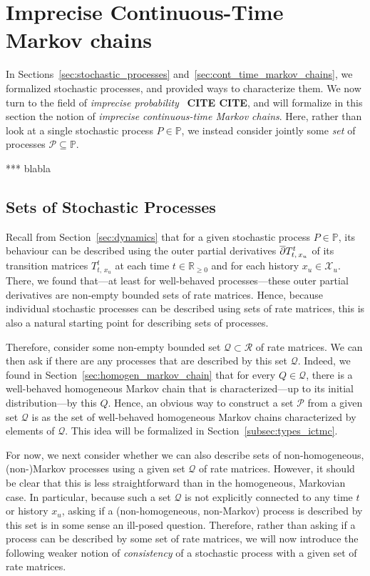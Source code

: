 \documentclass[10pt,a4paper]{paper}
\theoremstyle{definition}
\newcommand{\reals}{\mathbb{R}}
\newcommand{\realsnonneg}{\reals_{\geq 0}}
\newcommand{\states}{\mathcal{X}}
\newcommand{\processes}{\mathbb{P}}
\newcommand{\rateset}{\mathcal{Q}}
\begin{document}
\section{Imprecise Continuous-Time Markov chains}
\label{sec:iCTMC}

In Sections~\ref{sec:stochastic_processes} and~\ref{sec:cont_time_markov_chains}, we formalized stochastic processes, and provided ways to characterize them. We now turn to the field of \emph{imprecise probability}~\cite{Walley:1991vk} {\bf CITE CITE}, and will formalize in this section the notion of \emph{imprecise continuous-time Markov chains}. Here, rather than look at a single stochastic process $P\in\processes$, we instead consider jointly some \emph{set} of processes $\mathcal{P}\subseteq\processes$.

*** blabla

\subsection{Sets of Stochastic Processes}

Recall from Section~\ref{sec:dynamics} that for a given stochastic process $P\in\processes$, its behaviour can be described using the outer partial derivatives $\smash{\overline{\partial}}T_{t,\,x_u}^t$ of its transition matrices $T_{t,\,x_u}^t$ at each time $t\in\realsnonneg$ and for each history $x_u\in\states_u$. There, we found that---at least for well-behaved processes---these outer partial derivatives are non-empty bounded sets of rate matrices. Hence, because individual stochastic processes can be described using sets of rate matrices, this is also a natural starting point for describing sets of processes.

Therefore, consider some non-empty bounded set $\rateset\subset\mathcal{R}$ of rate matrices. We can then ask if there are any processes that are described by this set $\rateset$. Indeed, we found in Section~\ref{sec:homogen_markov_chain} that for every $Q\in\rateset$, there is a well-behaved homogeneous Markov chain that is characterized---up to its initial distribution---by this $Q$. Hence, an obvious way to construct a set $\mathcal{P}$ from a given set $\rateset$ is as the set of well-behaved homogeneous Markov chains characterized by elements of $\rateset$. This idea will be formalized in Section~\ref{subsec:types_ictmc}.

For now, we next consider whether we can also describe sets of non-homogeneous, (non-)Markov processes using a given set $\rateset$ of rate matrices. However, it should be clear that this is less straightforward than in the homogeneous, Markovian case. In particular, because such a set $\rateset$ is not explicitly connected to any time $t$ or history $x_u$, asking if a (non-homogeneous, non-Markov) process is described by this set is in some sense an ill-posed question.
Therefore, rather than asking if a process can be described by some set of rate matrices, we will now introduce the following weaker notion of \emph{consistency} of a stochastic process with a given set of rate matrices.
\end{document}
